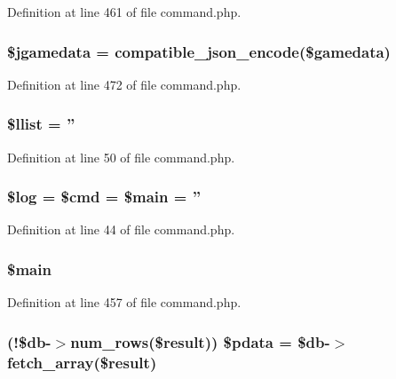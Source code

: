 Definition at line 461 of file command.\+php.

\hypertarget{command_8php_ad8ad32ee4a34333c6c5c5b4379a80cf2}{
\subsubsection[{\$jgamedata}]{\setlength{\rightskip}{0pt plus 5cm}\$jgamedata = {\bf compatible\+\_\+json\+\_\+encode}(\$gamedata)}}\label{command_8php_ad8ad32ee4a34333c6c5c5b4379a80cf2}


Definition at line 472 of file command.\+php.

\hypertarget{command_8php_a5d54a0278e200a0ff8007926c5dd2a10}{
\subsubsection[{\$llist}]{\setlength{\rightskip}{0pt plus 5cm}\$llist = ''}}\label{command_8php_a5d54a0278e200a0ff8007926c5dd2a10}


Definition at line 50 of file command.\+php.

\hypertarget{command_8php_a9a2cf15a653aee8be437f7ae474cd494}{
\subsubsection[{\$log}]{\setlength{\rightskip}{0pt plus 5cm}\$log = \$cmd = \$main = ''}}\label{command_8php_a9a2cf15a653aee8be437f7ae474cd494}


Definition at line 44 of file command.\+php.

\hypertarget{command_8php_a67a14860123d3f27f92196239b0a5b46}{
\subsubsection[{\$main}]{\setlength{\rightskip}{0pt plus 5cm}\$main}}\label{command_8php_a67a14860123d3f27f92196239b0a5b46}


Definition at line 457 of file command.\+php.

\hypertarget{command_8php_a6378350bbbdfdf1fdd8c8e1cd0607a8d}{
\subsubsection[{\$pdata}]{ (!\$db-\/$>$num\+\_\+rows(\${\bf result})) \$pdata = \$db-\/$>$fetch\+\_\+array(\${\bf result})}}\label{command_8php_a6378350bbbdfdf1fdd8c8e1cd0607a8d}


